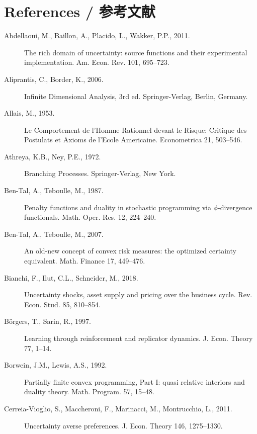 \documentclass[12pt,a4paper]{article}
\newenvironment{original}
  {\par\noindent\color{black}\smallskip}
  {\par\smallskip}
\begin{document}
\newpage
\section*{References / 参考文献}

\begin{original}
\begin{description}
\item[Abdellaoui, M., Baillon, A., Placido, L., Wakker, P.P., 2011.] The rich domain of uncertainty: source functions and their experimental implementation. Am. Econ. Rev. 101, 695--723.

\item[Aliprantis, C., Border, K., 2006.] Infinite Dimensional Analysis, 3rd ed. Springer-Verlag, Berlin, Germany.

\item[Allais, M., 1953.] Le Comportement de l'Homme Rationnel devant le Risque: Critique des Postulats et Axioms de l'Ecole Americaine. Econometrica 21, 503--546.

\item[Athreya, K.B., Ney, P.E., 1972.] Branching Processes. Springer-Verlag, New York.

\item[Ben-Tal, A., Teboulle, M., 1987.] Penalty functions and duality in stochastic programming via $\phi$-divergence functionals. Math. Oper. Res. 12, 224--240.

\item[Ben-Tal, A., Teboulle, M., 2007.] An old-new concept of convex risk measures: the optimized certainty equivalent. Math. Finance 17, 449--476.

\item[Bianchi, F., Ilut, C.L., Schneider, M., 2018.] Uncertainty shocks, asset supply and pricing over the business cycle. Rev. Econ. Stud. 85, 810--854.

\item[B\"{o}rgers, T., Sarin, R., 1997.] Learning through reinforcement and replicator dynamics. J. Econ. Theory 77, 1--14.

\item[Borwein, J.M., Lewis, A.S., 1992.] Partially finite convex programming, Part I: quasi relative interiors and duality theory. Math. Program. 57, 15--48.

\item[Cerreia-Vioglio, S., Maccheroni, F., Marinacci, M., Montrucchio, L., 2011.] Uncertainty averse preferences. J. Econ. Theory 146, 1275--1330.


\end{description}
\end{original}
\end{document}
